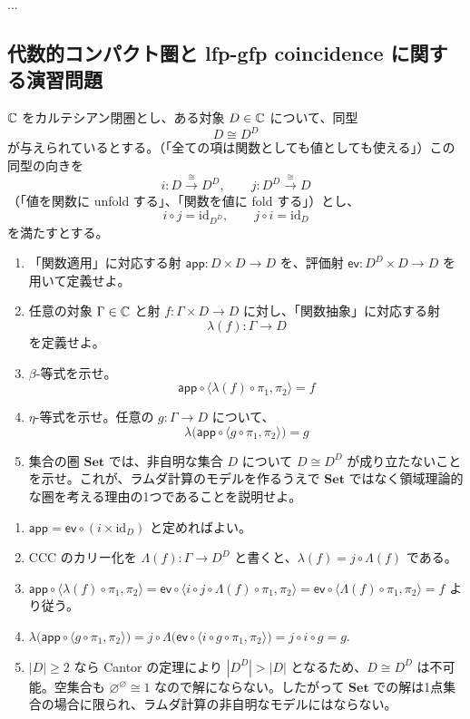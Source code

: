 \documentclass[
		head_space=20mm,
		foot_space=20mm,
		gutter=10mm,
		line_length=190mm
]{jlreq}
\begin{document}
\begin{answer}
	... 
\end{answer}

\clearpage

\subsection*{代数的コンパクト圏と lfp-gfp coincidence に関する演習問題}

\begin{practice}[型なしラムダ計算のモデル]
	$\mathbb{C}$ をカルテシアン閉圏とし、ある対象 $D\in\mathbb{C}$ について、同型 \[D\cong D^D\] が与えられているとする。（「全ての項は関数としても値としても使える」）この同型の向きを \\ \[i:D\xrightarrow{\cong} D^D,\qquad j:D^D\xrightarrow{\cong} D\] （「値を関数に unfold する」、「関数を値に fold する」）とし、 \[i\circ j=\mathrm{id}_{D^D},\qquad j\circ i=\mathrm{id}_D\] を満たすとする。
	\begin{enumerate}
		\item 「関数適用」に対応する射 $\mathsf{app}:D\times D\to D$ を、評価射 $\mathsf{ev}:D^D\times D\to D$ を用いて定義せよ。
		\item 任意の対象 $\Gamma\in\mathbb{C}$ と射 $f:\Gamma\times D\to D$ に対し、「関数抽象」に対応する射 \[\lambda(f):\Gamma\to D\] を定義せよ。
		\item $\beta$-等式を示せ。\[\mathsf{app}\circ\langle \lambda(f)\circ\pi_1,\pi_2\rangle=f\] 
		\item $\eta$-等式を示せ。任意の $g:\Gamma\to D$ について、\[\lambda\bigl(\mathsf{app}\circ\langle g\circ\pi_1,\pi_2\rangle\bigr)=g\] 
		\item 集合の圏 $\mathbf{Set}$ では、非自明な集合 $D$ について $D\cong D^D$ が成り立たないことを示せ。これが、ラムダ計算のモデルを作るうえで $\mathbf{Set}$ ではなく領域理論的な圏を考える理由の1つであることを説明せよ。
	\end{enumerate}
\end{practice}

\begin{answer}
	\begin{enumerate}
		\item $\mathsf{app} = \mathsf{ev}\circ(i\times\mathrm{id}_D)$ と定めればよい。
		\item CCC のカリー化を $\Lambda(f):\Gamma\to D^D$ と書くと、$\lambda(f)=j\circ\Lambda(f)$ である。
		\item $\mathsf{app}\circ\langle \lambda(f)\circ\pi_1,\pi_2\rangle = \mathsf{ev}\circ\langle i\circ j\circ\Lambda(f)\circ\pi_1,\pi_2\rangle = \mathsf{ev}\circ\langle \Lambda(f)\circ\pi_1,\pi_2\rangle = f$ より従う。
		\item $\lambda\bigl(\mathsf{app}\circ\langle g\circ\pi_1,\pi_2\rangle\bigr) = j\circ\Lambda\bigl(\mathsf{ev}\circ\langle i\circ g\circ\pi_1,\pi_2\rangle\bigr) = j\circ i\circ g = g.$ 
		\item $|D|\geq 2$ なら Cantor の定理により $|D^D|>|D|$ となるため、$D\cong D^D$ は不可能。空集合も $\varnothing^\varnothing\cong 1$ なので解にならない。したがって $\mathbf{Set}$ での解は1点集合の場合に限られ、ラムダ計算の非自明なモデルにはならない。
	\end{enumerate}
\end{answer}
\end{document}

